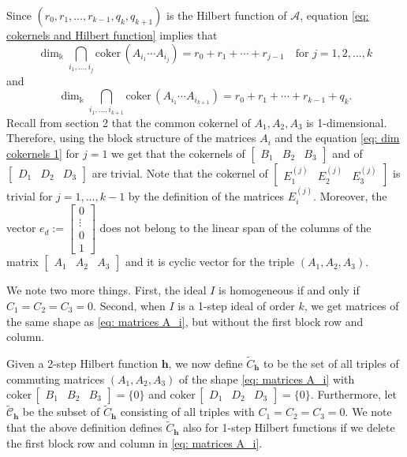 \documentclass[11pt]{amsart}
\theoremstyle{definition}
\newcommand{\kk}{\Bbbk}
\newcommand{\h}{\mathbf{h}}
\newcommand{\tC}{\widetilde{C}}
\newcommand{\tcC}{\widetilde{\mathscr{C}}}
\newcommand{\cA}{\mathcal{A}}
\begin{document}
Since $(r_0,r_1,\ldots ,r_{k-1},q_k,q_{k+1})$ is the Hilbert function of $\cA$, equation \eqref{eq: cokernels and Hilbert function} implies that
\begin{equation}\label{eq: dim cokernels 1}
\dim_{\kk}\bigcap_{i_1,\ldots ,i_j}\mathrm{coker}\, (A_{i_1}\cdots A_{i_j})=r_0+r_1+\cdots +r_{j-1}\quad \mathrm{for}\, \, j=1,2,\ldots ,k
\end{equation}
and
\begin{equation}\label{eq: dim cokernels 2}
\dim_{\kk}\bigcap_{i_1,\ldots ,i_{k+1}}\mathrm{coker}\, (A_{i_1}\cdots A_{i_{k+1}})=r_0+r_1+\cdots +r_{k-1}+q_k.
\end{equation}
Recall from section 2 that the common cokernel of $A_1,A_2,A_3$ is 1-dimensional. Therefore, using the block structure of the matrices $A_i$ and the equation \eqref{eq: dim cokernels 1} for $j=1$ we get that the cokernels of $\begin{bmatrix}B_1 & B_2 & B_3\end{bmatrix}$ and of $\begin{bmatrix}D_1 & D_2 & D_3\end{bmatrix}$ are trivial. Note that the cokernel of $\begin{bmatrix}E_1^{(j)} & E_2^{(j)} & E_3^{(j)}\end{bmatrix}$ is trivial for $j=1,\ldots ,k-1$ by the definition of the matrices $E_i^{(j)}$. Moreover, the vector $e_d:=\begin{bmatrix} 0 \\ \vdots \\ 0 \\ 1\end{bmatrix}$ does not belong to the linear span of the columns of the matrix $\begin{bmatrix} A_1 & A_2 & A_3\end{bmatrix}$ and it is cyclic vector for the triple $(A_1,A_2,A_3)$.

We note two more things. First, the ideal $I$ is homogeneous if and only if $C_1=C_2=C_3=0$. Second, when $I$ is a 1-step ideal of order $k$, we get matrices of the same shape as \eqref{eq: matrices A_i}, but without the first block row and column.

Given a 2-step Hilbert function $\h$, we now define $\tC_\h$ to be the set of all triples of commuting matrices $(A_1,A_2,A_3)$ of the shape \eqref{eq: matrices A_i} with $\mathrm{coker}\, \begin{bmatrix}B_1 & B_2 & B_3\end{bmatrix}=\{0\}$ and $\mathrm{coker}\, \begin{bmatrix}D_1 & D_2 & D_3\end{bmatrix}=\{0\}$. Furthermore, let $\tcC_\h$ be the subset of $\tC_\h$ consisting of all triples with $C_1=C_2=C_3=0$. We note that the above definition defines $\tC_\h$ also for 1-step Hilbert functions if we delete the first block row and column in \eqref{eq: matrices A_i}.
\end{document}
